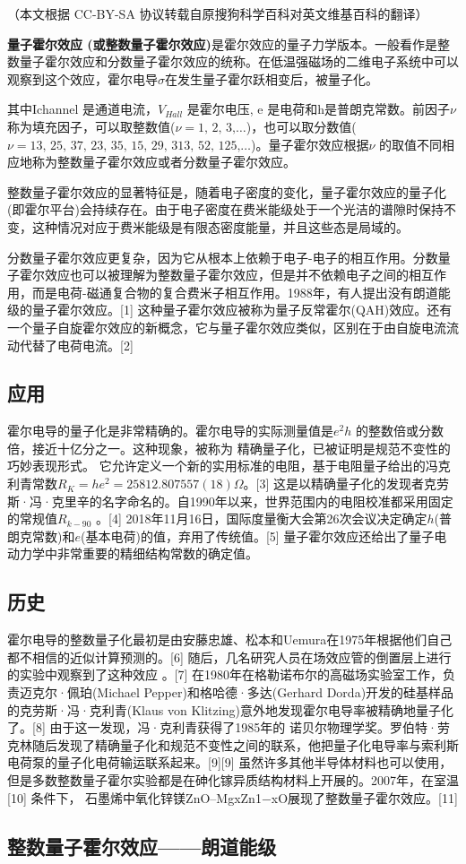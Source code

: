 
（本文根据 CC-BY-SA 协议转载自原搜狗科学百科对英文维基百科的翻译）

\textbf{量子霍尔效应 (或整数量子霍尔效应)}是霍尔效应的量子力学版本。一般看作是整数量子霍尔效应和分数量子霍尔效应的统称。在低温强磁场的二维电子系统中可以观察到这个效应，霍尔电导$\sigma$在发生量子霍尔跃相变后，被量子化。

其中Ichannel 是通道电流，$V_{Hall}$ 是霍尔电压, e 是电荷和h是普朗克常数。前因子$\nu$ 称为填充因子，可以取整数值($\nu =\text{1, 2, 3,…}$)，也可以取分数值( $\nu=\text{13, 25, 37, 23, 35, 15, 29, 313, 52, 125,…}$)。量子霍尔效应根据$\nu$ 的取值不同相应地称为整数量子霍尔效应或者分数量子霍尔效应。

整数量子霍尔效应的显著特征是，随着电子密度的变化，量子霍尔效应的量子化(即霍尔平台)会持续存在。由于电子密度在费米能级处于一个光洁的谱隙时保持不变，这种情况对应于费米能级是有限态密度能量，并且这些态是局域的。

分数量子霍尔效应更复杂，因为它从根本上依赖于电子-电子的相互作用。分数量子霍尔效应也可以被理解为整数量子霍尔效应，但是并不依赖电子之间的相互作用，而是电荷-磁通复合物的复合费米子相互作用。1988年，有人提出没有朗道能级的量子霍尔效应。[1] 这种量子霍尔效应被称为量子反常霍尔(QAH)效应。还有一个量子自旋霍尔效应的新概念，它与量子霍尔效应类似，区别在于由自旋电流流动代替了电荷电流。[2]

\subsection{应用}
霍尔电导的量子化是非常精确的。霍尔电导的实际测量值是$e^2h$ 的整数倍或分数倍，接近十亿分之一。这种现象，被称为 精确量子化，已被证明是规范不变性的巧妙表现形式。 它允许定义一个新的实用标准的电阻，基于电阻量子给出的冯克利青常数$R_K = he^2 = 25812.807557(18)\Omega$。[3] 这是以精确量子化的发现者克劳斯·冯·克里辛的名字命名的。自1990年以来，世界范围内的电阻校准都采用固定的常规值$R_{k-90}$ 。[4] 2018年11月16日，国际度量衡大会第26次会议决定确定$h$(普朗克常数)和$e$(基本电荷)的值，弃用了传统值。[5] 量子霍尔效应还给出了量子电动力学中非常重要的精细结构常数的确定值。

\subsection{历史}
霍尔电导的整数量子化最初是由安藤忠雄、松本和Uemura在1975年根据他们自己都不相信的近似计算预测的。[6] 随后，几名研究人员在场效应管的倒置层上进行的实验中观察到了这种效应 。[7] 在1980年在格勒诺布尔的高磁场实验室工作，负责迈克尔·佩珀(Michael Pepper)和格哈德·多达(Gerhard Dorda)开发的硅基样品的克劳斯·冯·克利青(Klaus von Klitzing)意外地发现霍尔电导率被精确地量子化了。[8] 由于这一发现，冯·克利青获得了1985年的 诺贝尔物理学奖。罗伯特·劳克林随后发现了精确量子化和规范不变性之间的联系，他把量子化电导率与索利斯电荷泵的量子化电荷输运联系起来。[9][9] 虽然许多其他半导体材料也可以使用，但是多数整数量子霍尔实验都是在砷化镓异质结构材料上开展的。2007年，在室温[10] 条件下， 石墨烯中氧化锌镁ZnO–MgxZn1−xO展现了整数量子霍尔效应。[11]

\subsection{整数量子霍尔效应——朗道能级}